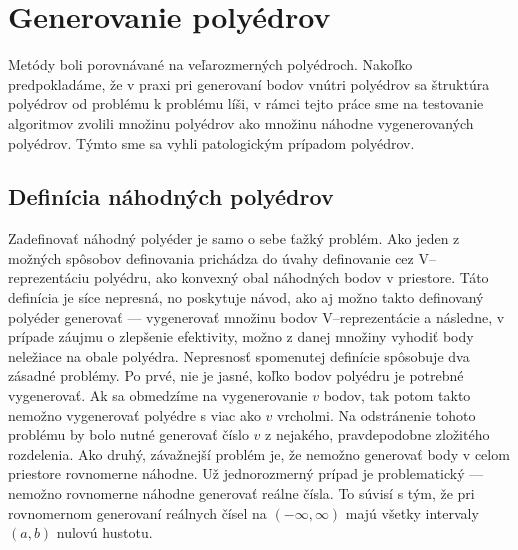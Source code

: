 \section{Generovanie polyédrov}
Metódy boli porovnávané na veľarozmerných polyédroch.
Nakoľko predpokladáme, že v praxi pri generovaní bodov vnútri polyédrov sa štruktúra polyédrov od problému k problému líši, v rámci tejto práce sme na testovanie algoritmov zvolili množinu polyédrov ako množinu náhodne vygenerovaných polyédrov.
Týmto sme sa vyhli patologickým prípadom polyédrov.

\subsection{Definícia náhodných polyédrov}
Zadefinovať náhodný polyéder je samo o sebe ťažký problém. Ako jeden z možných spôsobov definovania prichádza do úvahy definovanie cez V--reprezentáciu polyédru, ako konvexný obal náhodných bodov v priestore. Táto definícia je síce nepresná, no poskytuje návod, ako aj možno takto definovaný polyéder generovať --- vygenerovať množinu bodov V--reprezentácie a následne, v prípade záujmu o zlepšenie efektivity, možno z danej množiny vyhodiť body neležiace na obale polyédra. Nepresnosť spomenutej definície spôsobuje dva zásadné problémy.
Po prvé, nie je jasné, koľko bodov polyédru je potrebné vygenerovať. Ak sa obmedzíme na vygenerovanie $v$ bodov, tak potom takto nemožno vygenerovať polyédre s viac ako $v$ vrcholmi. Na odstránenie tohoto problému by bolo nutné generovať číslo $v$ z nejakého, pravdepodobne zložitého rozdelenia. 
Ako druhý, závažnejší problém je, že nemožno generovať body v celom priestore rovnomerne náhodne. Už jednorozmerný prípad je problematický --- nemožno rovnomerne náhodne generovať reálne čísla. To súvisí s tým, že pri rovnomernom generovaní reálnych čísel na $(-\infty, \infty)$ majú všetky intervaly $(a,b)$ nulovú hustotu.\\

